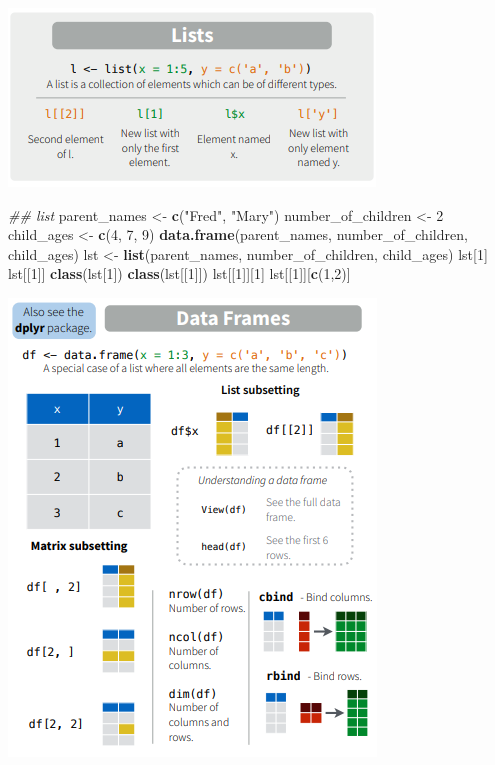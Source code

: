 \documentclass[
]{book}
\newenvironment{Shaded}{\begin{snugshade}}{\end{snugshade}}
\newcommand{\CommentTok}[1]{\textcolor[rgb]{0.56,0.35,0.01}{\textit{#1}}}
\newcommand{\DecValTok}[1]{\textcolor[rgb]{0.00,0.00,0.81}{#1}}
\newcommand{\KeywordTok}[1]{\textcolor[rgb]{0.13,0.29,0.53}{\textbf{#1}}}
\newcommand{\NormalTok}[1]{#1}
\newcommand{\StringTok}[1]{\textcolor[rgb]{0.31,0.60,0.02}{#1}}
\begin{document}
\includegraphics{images/03/05.PNG}

\begin{Shaded}
\begin{Highlighting}[]
\CommentTok{\#\# list}
\NormalTok{parent\_names <{-}}\StringTok{ }\KeywordTok{c}\NormalTok{(}\StringTok{"Fred"}\NormalTok{, }\StringTok{"Mary"}\NormalTok{)}
\NormalTok{number\_of\_children <{-}}\StringTok{ }\DecValTok{2}
\NormalTok{child\_ages <{-}}\StringTok{ }\KeywordTok{c}\NormalTok{(}\DecValTok{4}\NormalTok{, }\DecValTok{7}\NormalTok{, }\DecValTok{9}\NormalTok{)}
\KeywordTok{data.frame}\NormalTok{(parent\_names, number\_of\_children, child\_ages)}
\NormalTok{lst <{-}}\StringTok{ }\KeywordTok{list}\NormalTok{(parent\_names, number\_of\_children, child\_ages)}
\NormalTok{lst[}\DecValTok{1}\NormalTok{]}
\NormalTok{lst[[}\DecValTok{1}\NormalTok{]]}
\KeywordTok{class}\NormalTok{(lst[}\DecValTok{1}\NormalTok{])}
\KeywordTok{class}\NormalTok{(lst[[}\DecValTok{1}\NormalTok{]])}
\NormalTok{lst[[}\DecValTok{1}\NormalTok{]][}\DecValTok{1}\NormalTok{]}
\NormalTok{lst[[}\DecValTok{1}\NormalTok{]][}\KeywordTok{c}\NormalTok{(}\DecValTok{1}\NormalTok{,}\DecValTok{2}\NormalTok{)]}
\end{Highlighting}
\end{Shaded}

\includegraphics{images/03/06.PNG}
\end{document}

